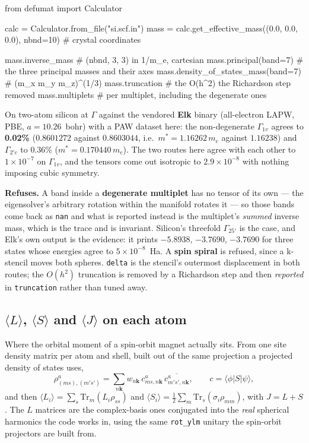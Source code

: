 \documentclass[11pt,a4paper]{article}
\newcommand{\code}[1]{\texttt{\small #1}}
\begin{document}
\begin{pycode}
from defumat import Calculator

calc = Calculator.from_file("si.scf.in")
mass = calc.get_effective_mass((0.0, 0.0, 0.0), nbnd=10)  # crystal coordinates

mass.inverse_mass          # (nbnd, 3, 3) in 1/m_e, cartesian
mass.principal(band=7)     # the three principal masses and their axes
mass.density_of_states_mass(band=7)   # (m_x m_y m_z)^(1/3)
mass.truncation            # the O(h^2) the Richardson step removed
mass.multiplets            # per multiplet, including the degenerate ones
\end{pycode}

On two-atom silicon at $\Gamma$ against the vendored \textbf{Elk} binary
(all-electron LAPW, PBE, $a = 10.26$~bohr) with a PAW dataset here: the
non-degenerate $\Gamma_{1v}$ agrees to \textbf{0.02\%} ($0.8601272$ against
$0.8603044$, i.e.\ $m^* = 1.16262\,m_e$ against $1.16238$) and $\Gamma_{2'c}$ to
0.36\% ($m^* = 0.170440\,m_e$). The two routes here agree with each other to
$1\times10^{-7}$ on $\Gamma_{1v}$, and the tensors come out isotropic to
$2.9\times10^{-8}$ with nothing imposing cubic symmetry.

\begin{refuses}
\textbf{Refuses.} A band inside a \textbf{degenerate multiplet} has no tensor of
its own --- the eigensolver's arbitrary rotation within the manifold rotates it
--- so those bands come back as \code{nan} and what is reported instead is the
multiplet's \emph{summed} inverse mass, which is the trace and is invariant.
Silicon's threefold $\Gamma_{25'}$ is the case, and Elk's own output is the
evidence: it prints $-5.8938$, $-3.7690$, $-3.7690$ for three states whose
energies agree to $5\times10^{-8}$~Ha. A \textbf{spin spiral} is refused, since
a k-stencil moves both spheres. \code{delta} is the stencil's outermost
displacement in both routes; the $O(h^2)$ truncation is removed by a Richardson
step and then \emph{reported} in \code{truncation} rather than tuned away.
\end{refuses}

\subsection{\texorpdfstring{$\langle L\rangle$, $\langle S\rangle$ and $\langle J\rangle$ on each atom}{L, S and J on each atom}}

Where the orbital moment of a spin-orbit magnet actually sits. From one site
density matrix per atom and shell, built out of the same projection a projected
density of states uses,
\begin{equation*}
  \rho^a_{(ms),(m's')} = \sum_{n\mathbf k} w_{n\mathbf k}\,
     c^a_{ms,n\mathbf k}\, \overline{c^a_{m's',n\mathbf k}},
  \qquad c = \langle \phi | S | \psi \rangle,
\end{equation*}
and then $\langle L_i\rangle = \sum_s \mathrm{Tr}_m (L_i \rho_{ss})$ and
$\langle S_i \rangle = \tfrac12 \sum_m \mathrm{Tr}_s (\sigma_i \rho_{mm})$, with
$J = L + S$. The $L$ matrices are the complex-basis ones conjugated into the
\emph{real} spherical harmonics the code works in, using the same \code{rot\_ylm}
unitary the spin-orbit projectors are built from.
\end{document}
